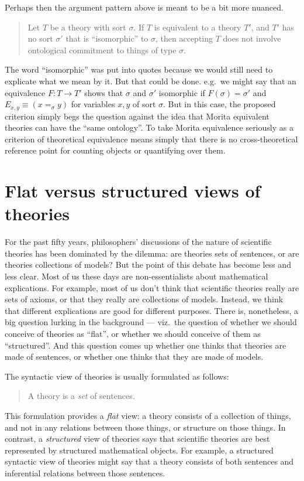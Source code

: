 Perhaps then the argument pattern above is meant to be a bit more
nuanced.
\begin{quote} Let $T$ be a theory with sort $\sigma$.  If $T$ is
  equivalent to a theory $T'$, and $T'$ has no sort $\sigma '$ that is
  ``isomorphic'' to $\sigma$, then accepting $T$ does not involve
  ontological commitment to things of type $\sigma$. \end{quote} The
word ``isomorphic'' was put into quotes because we would still need to
explicate what we mean by it.  But that could be done.  e.g.\ we might
say that an equivalence $F:T\to T'$ shows that $\sigma$ and $\sigma '$
isomorphic if $F(\sigma )=\sigma '$ and $E_{x,y}\equiv (x=_\sigma y)$
for variables $x,y$ of sort $\sigma$.  But in this case, the proposed
criterion simply begs the question against the idea that Morita
equivalent theories can have the ``same ontology''.  To take Morita
equivalence seriously as a criterion of theoretical equivalence means
simply that there is no cross-theoretical reference point for counting
objects or quantifying over them.


\section{Flat versus structured views of theories} \label{sec:flat}

For the past fifty years, philosophers' discussions of the nature of
scientific theories has been dominated by the dilemma: are theories
sets of sentences, or are theories collections of models?  But the
point of this debate has become less and less clear.  Most of us these
days are non-essentialists about mathematical explications.  For
example, most of us don't think that scientific theories really are
sets of axioms, or that they really are collections of models.
Instead, we think that different explications are good for different
purposes.  There is, nonetheless, a big question lurking in the
background --- viz.\ the question of whether we should conceive of
theories as ``flat'', or whether we should conceive of them as
``structured''.  And this question comes up whether one thinks that
theories are made of sentences, or whether one thinks that they are
made of models.

The syntactic view of theories is usually formulated as follows:
\begin{quote} A theory is a {\it set} of sentences. \end{quote} This
formulation provides a {\it flat} view: a theory consists of a
collection of things, and not in any relations between those things,
or structure on those things.  In contrast, a {\it structured} view of
theories says that scientific theories are best represented by
structured mathematical objects.  For example, a structured syntactic
view of theories might say that a theory consists of both sentences
and inferential relations between those sentences.

